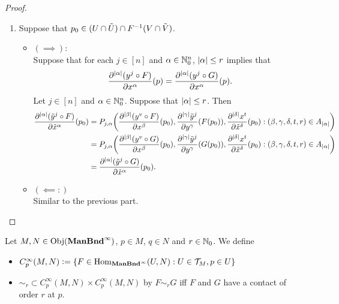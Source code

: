 \documentclass{book}
\begin{document}
\begin{proof}
\begin{enumerate}
\begin{itemize}
\begin{align*}
				& \quad \quad + \bigg(\frac{\p^{|\xi_{\be}|} (y^{\xi_v} \circ F)}{\p x^{\xi_{\be}}} \bigg)^{\mu_{\xi}} \bigg( \frac{\p^{|\xi_{\gam}|} \tl{y}^j}{\p y^{\xi_{\gam}}} \circ F \bigg)^{\sig_{\xi}} \tau_{\xi} \bigg( \frac{\p^{|\xi_{\del}|} x^{\xi_t}}{\p \tl{x}^{\xi_{\del}}} \bigg)^{\tau_{\xi} - 1} \bigg(  \frac{\p^{|\xi_{\del}| + 1} x^{\xi_t}}{\p \tl{x}^{\xi_{\del} + e_{l_0}}} \bigg) 
				\bigg] \\
				& = P_{j, \al}\bigg( \frac{\p^{|\xi_{\be}|} (y^{\xi_v} \circ F)}{\p x^{\xi_{\be}}},  \frac{\p^{|\xi_{\gam}|} \tl{y}^j}{\p y^{\xi_{\gam}}} \circ F, \frac{\p^{|\xi_{\del}|} x^{\xi_t}}{\p \tl{x}^{\xi_{\del}}} : \xi \in A_{|\al|} \bigg)
			\end{align*}  	
		\end{itemize}
		\item Suppose that $p_0 \in (U \cap \tilde{U}) \cap F^{-1}(V \cap \tilde{V})$.
		\begin{itemize}
			\item $(\implies):$ \\ 
			Suppose that for each $j \in [n]$ and $\alpha \in \mathbb{N}_0^n$, $|\alpha| \leq r$ implies that 
			$$\frac{\partial^{|\alpha|} (y^j \circ F)}{\partial x^{\alpha}}(p) =  \frac{\partial^{|\alpha|} (y^j \circ G)}{\partial x^{\alpha}}(p).$$
			Let $j \in [n]$ and $\alpha \in \mathbb{N}_0^n$. Suppose that $|\alpha| \leq r$. Then
			\begin{align*}
				\frac{\partial^{|\alpha|} (\tilde{y}^j \circ F)}{\partial \tilde{x}^{\alpha}}(p_0) 
				& = P_{j, \alpha}\bigg( \frac{\partial^{|\beta|} (y^{v} \circ F)}{\partial x^{\beta}}(p_0),  \frac{\partial^{|\gamma|} \tilde{y}^j}{\partial y^{\gamma}} (F(p_0)), \frac{\partial^{|\delta|} x^t}{\partial \tilde{x}^{\delta}}(p_0) : (\beta, \gamma, \delta, t, r) \in A_{|\alpha|} \bigg) \\
				& = P_{j, \alpha}\bigg( \frac{\partial^{|\beta|} (y^{v} \circ G)}{\partial x^{\beta}}(p_0),  \frac{\partial^{|\gamma|} \tilde{y}^j}{\partial y^{\gamma}} (G(p_0)), \frac{\partial^{|\delta|} x^t}{\partial \tilde{x}^{\delta}}(p_0) : (\beta, \gamma, \delta, t, r) \in A_{|\alpha|} \bigg) \\
				& =  \frac{\partial^{|\alpha|} (\tilde{y}^j \circ G)}{\partial \tilde{x}^{\alpha}}(p_0).
			\end{align*}
			\item $(\impliedby:)$ \\
			Similar to the previous part.
		\end{itemize} 
	\end{enumerate}
\end{proof}

\begin{defn}
	Let $M, N \in \operatorname{Obj}(\operatorname*{\text{\textbf{ManBnd}}^{\infty}})$, $p \in M$, $q \in N$ and $r \in \mathbb{N}_0$. We define 
	\begin{itemize}
		\item $C^{\infty}_p(M, N) \vcentcolon= \{ F \in \operatorname{Hom}_{\operatorname*{\text{\textbf{ManBnd}}^{\infty}}}(U, N): U \in \mathcal{T}_M, p \in U\}$ 
		\item ${\sim_r} \subset C^{\infty}_{p}(M, N) \times C^{\infty}_p(M, N)$ by $F {\sim_r} G$ iff $F$ and $G$ have a contact of order $r$ at $p$.  
	\end{itemize}
\end{defn}
\end{document}
